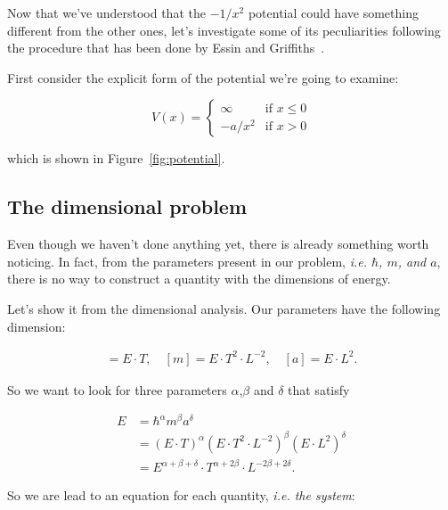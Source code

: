 Now that we've understood that the $-1/x^2$ potential could have something different from the other ones, let's investigate some of its peculiarities following the procedure that has been done by Essin and Griffiths~\cite{EssinGriffiths:10.1119/1.2165248}.

First consider the explicit form of the potential we're going to examine:

\begin{equation*}
    V(x) = \begin{cases}
        \infty    & \text{if } x \leq 0 \\
        - a / x^2 & \text{if } x > 0
    \end{cases}
\end{equation*}

which is shown in Figure~\ref{fig:potential}.

\subsection*{The dimensional problem}

Even though we haven't done anything yet, there is already something worth noticing. In fact, from the parameters present in our problem, \textit{i.e. \(\hbar\), \(m\), and \(a\)}, there is no way to construct a quantity with the dimensions of energy.

Let's show it from the dimensional analysis. Our parameters have the following dimension:

\begin{align*}
    [\hbar] = E \cdot T, \quad [m] = E \cdot T^2 \cdot L^{-2}, \quad [a] = E \cdot L^2.
\end{align*}

\noindent
So we want to look for three parameters $\alpha$,$\beta$ and $\delta$ that satisfy

\begin{align*}
    E & = \hbar^\alpha m^\beta a^\delta                                                      \\
      & = (E \cdot T)^\alpha (E \cdot T^2 \cdot L^{-2})^\beta (E \cdot L^2)^\delta           \\
      & = E^{\alpha + \beta + \delta} \cdot T^{\alpha + 2\beta} \cdot L^{-2\beta + 2\delta}.
\end{align*}

\noindent
So we are lead to an equation for each quantity, \textit{i.e. the system}:

